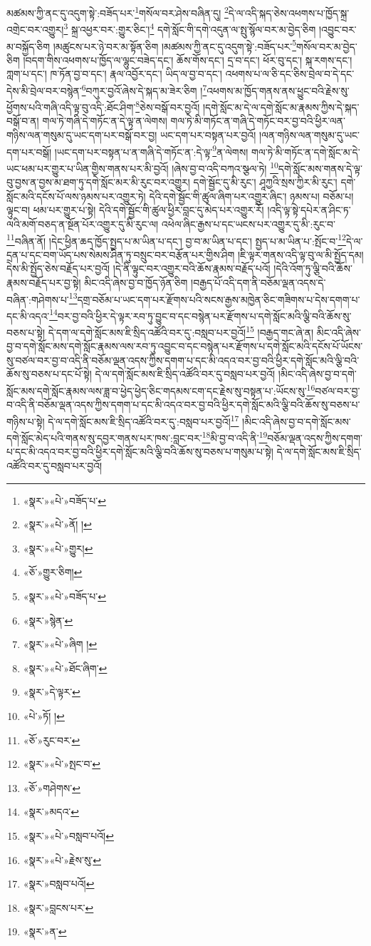 མཚམས་ཀྱི་ནང་དུ་འདུག་སྟེ་:བཟོད་པར་\footnote{«སྣར་»«པེ་»བཟོད་པ་}གསོལ་བར་ཤེས་བཞིན་དུ། \footnote{«སྣར་»«པེ་»ནོ། ། }དེ་ལ་འདི་སྐད་ཅེས་འཕགས་པ་ཁྱོད་སྐྲ་འགྲེང་བར་འགྱུར།\footnote{«སྣར་»«པེ་»གྱུར།} སྐྲ་འཕྱར་བར་:གྱུར་ཅིང་།\footnote{«ཅོ་»གྱུར་ཅིག།} དགེ་སློང་གི་དགེ་འདུན་ལ་སྤུ་སྙོལ་བར་མ་བྱེད་ཅིག །འབྱུང་བར་མ་བསྐྱོད་ཅིག །མཚུངས་པར་ཉེ་བར་མ་སྟོན་ཅིག །མཚམས་ཀྱི་ནང་དུ་འདུག་སྟེ་:བཟོད་པར་\footnote{«སྣར་»«པེ་»བཟོད་པ་}གསོལ་བར་མ་བྱེད་ཅིག །བདག་གིས་འཕགས་པ་ཁྱོད་ལ་ལྷུང་བཟེད་དང་། ཆོས་གོས་དང་། དྲ་བ་དང་། ཕོར་བུ་དང་། སྐ་རགས་དང་། ཀླག་པ་དང་། ཁ་ཏོན་བྱ་བ་དང་། རྣལ་འབྱོར་དང་། ཡིད་ལ་བྱ་བ་དང་། འཕགས་པ་ལ་ཅི་དང་ཅིས་བྲེལ་བ་དེ་དང་དེས་མི་བྲེལ་བར་བསྙེན་\footnote{«སྣར་»སྙེན་}བཀུར་བྱའོ་ཞེས་དེ་སྐད་མ་ཟེར་ཅིག །\footnote{«སྣར་»«པེ་»ཞིག །}འཕགས་མ་ཁྱོད་གནས་ནས་ཕྱུང་བའི་རྗེས་སུ་ཕྱོགས་པའི་གཞི་འདི་ལྟ་བུ་འདི་:ཐོང་ཤིག་\footnote{«སྣར་»«པེ་»ཐོང་ཞིག་}ཅེས་བསྒོ་བར་བྱའོ། །དགེ་སློང་མ་དེ་ལ་དགེ་སློང་མ་རྣམས་ཀྱིས་དེ་སྐད་བསྒོ་བ་ན། གལ་ཏེ་གཞི་དེ་གཏོང་ན་དེ་ལྟ་ན་ལེགས། གལ་ཏེ་མི་གཏོང་ན་གཞི་དེ་གཏོང་བར་བྱ་བའི་ཕྱིར་ལན་གཉིས་ལན་གསུམ་དུ་ཡང་དག་པར་བསྒོ་བར་བྱ། ཡང་དག་པར་བསྟན་པར་བྱའོ། །ལན་གཉིས་ལན་གསུམ་དུ་ཡང་དག་པར་བསྒོ། །ཡང་དག་པར་བསྟན་པ་ན་གཞི་དེ་གཏོང་ན་:དེ་ལྟ་\footnote{«སྣར་»དེ་ལྟར་}ན་ལེགས། གལ་ཏེ་མི་གཏོང་ན་དགེ་སློང་མ་དེ་ཡང་ཕམ་པར་གྱུར་པ་ཡིན་གྱིས་གནས་པར་མི་བྱའོ། །ཞེས་བྱ་བ་འདི་བཀའ་སྩལ་ཏེ། \footnote{«པེ་»ཏོ། ། }དགེ་སློང་མས་གནས་དེ་ལྟ་བུ་བྱས་ན་བྱས་མ་ཐག་ཏུ་དགེ་སློང་མར་མི་རུང་བར་འགྱུར། དགེ་སྦྱོང་དུ་མི་རུང་། ཤཱཀྱའི་སྲས་ཀྱིར་མི་རུང་། དགེ་སློང་མའི་དངོས་པོ་ལས་ཉམས་པར་འགྱུར་ཏེ། དེའི་དགེ་སྦྱོང་གི་ཚུལ་ཞིག་པར་འགྱུར་ཞིང་། ཉམས་པ། བཅོམ་པ། ལྟུང་བ། ཕམ་པར་གྱུར་པ་སྟེ། དེའི་དགེ་སྦྱོང་གི་ཚུལ་ཕྱིར་བླང་དུ་མེད་པར་འགྱུར་རོ། །འདི་ལྟ་སྟེ་དཔེར་ན་ཤིང་ཏ་ལའི་མགོ་བཅད་ན་སྔོན་པོར་འགྱུར་དུ་མི་རུང་ལ། འཕེལ་ཞིང་རྒྱས་པ་དང་ཡངས་པར་འགྱུར་དུ་མི་:རུང་བ་\footnote{«ཅོ་»རུང་བར་}བཞིན་ནོ། །དེང་ཕྱིན་ཆད་ཁྱོད་སྤྱད་པ་མ་ཡིན་པ་དང་། བྱ་བ་མ་ཡིན་པ་དང་། སྤྱད་པ་མ་ཡིན་པ་:སྤོང་བ་\footnote{«སྣར་»«པེ་»སྤང་བ་}དེ་ལ་དྲན་པ་དང་བག་ཡོད་པས་སེམས་ཤིན་ཏུ་བསྲུང་བར་བརྩོན་པར་གྱིས་ཤིག །ཇི་ལྟར་གནས་འདི་ལྟ་བུ་ལ་མི་སྤྱོད་དམ། དེས་མི་སྤྱོད་ཅེས་བརྗོད་པར་བྱའོ། །དེ་ནི་ལྟུང་བར་འགྱུར་བའི་ཆོས་རྣམས་བརྗོད་པའོ། །དེའི་འོག་ཏུ་ལྕི་བའི་ཆོས་རྣམས་བརྗོད་པར་བྱ་སྟེ། མིང་འདི་ཞེས་བྱ་བ་ཁྱོད་ཉོན་ཅིག །བརྒྱད་པོ་འདི་དག་ནི་བཅོམ་ལྡན་འདས་དེ་བཞིན་:གཤེགས་པ་\footnote{«ཅོ་»གཤེགས་}དགྲ་བཅོམ་པ་ཡང་དག་པར་རྫོགས་པའི་སངས་རྒྱས་མཁྱེན་ཅིང་གཟིགས་པ་དེས་དགག་པ་དང་མི་འདའ་\footnote{«སྣར་»མདའ་}བར་བྱ་བའི་ཕྱིར་དེ་ལྟར་རབ་ཏུ་བྱུང་བ་དང་བསྙེན་པར་རྫོགས་པ་དགེ་སློང་མའི་ལྕི་བའི་ཆོས་སུ་བཅས་པ་སྟེ། དེ་དག་ལ་དགེ་སློང་མས་ཇི་སྲིད་འཚོའི་བར་དུ་:བསླབ་པར་བྱའོ།\footnote{«སྣར་»«པེ་»བསླབ་པའོ།} །བརྒྱད་གང་ཞེ་ན། མིང་འདི་ཞེས་བྱ་བ་དགེ་སློང་མས་དགེ་སློང་རྣམས་ལས་རབ་ཏུ་འབྱུང་བ་དང་བསྙེན་པར་རྫོགས་པ་དགེ་སློང་མའི་དངོས་པོ་ཡོངས་སུ་བཙལ་བར་བྱ་བ་འདི་ནི་བཅོམ་ལྡན་འདས་ཀྱིས་དགག་པ་དང་མི་འདའ་བར་བྱ་བའི་ཕྱིར་དགེ་སློང་མའི་ལྕི་བའི་ཆོས་སུ་བཅས་པ་དང་པོ་སྟེ། དེ་ལ་དགེ་སློང་མས་ཇི་སྲིད་འཚོའི་བར་དུ་བསླབ་པར་བྱའོ། །མིང་འདི་ཞེས་བྱ་བ་དགེ་སློང་མས་དགེ་སློང་རྣམས་ལས་ཟླ་བ་ཕྱེད་ཕྱེད་ཅིང་གདམས་ངག་དང་རྗེས་སུ་བསྟན་པ་:ཡོངས་སུ་\footnote{«སྣར་»«པེ་»རྗེས་སུ་}བཙལ་བར་བྱ་བ་འདི་ནི་བཅོམ་ལྡན་འདས་ཀྱིས་དགག་པ་དང་མི་འདའ་བར་བྱ་བའི་ཕྱིར་དགེ་སློང་མའི་ལྕི་བའི་ཆོས་སུ་བཅས་པ་གཉིས་པ་སྟེ། དེ་ལ་དགེ་སློང་མས་ཇི་སྲིད་འཚོའི་བར་དུ་:བསླབ་པར་བྱའོ།\footnote{«སྣར་»བསླབ་པའོ།} །མིང་འདི་ཞེས་བྱ་བ་དགེ་སློང་མས་དགེ་སློང་མེད་པའི་གནས་སུ་དབྱར་གནས་པར་ཁས་:བླང་བར་\footnote{«སྣར་»བླངས་པར་}མི་བྱ་བ་འདི་ནི་\footnote{«སྣར་»ན་}བཅོམ་ལྡན་འདས་ཀྱིས་དགག་པ་དང་མི་འདའ་བར་བྱ་བའི་ཕྱིར་དགེ་སློང་མའི་ལྕི་བའི་ཆོས་སུ་བཅས་པ་གསུམ་པ་སྟེ། དེ་ལ་དགེ་སློང་མས་ཇི་སྲིད་འཚོའི་བར་དུ་བསླབ་པར་བྱའོ། 